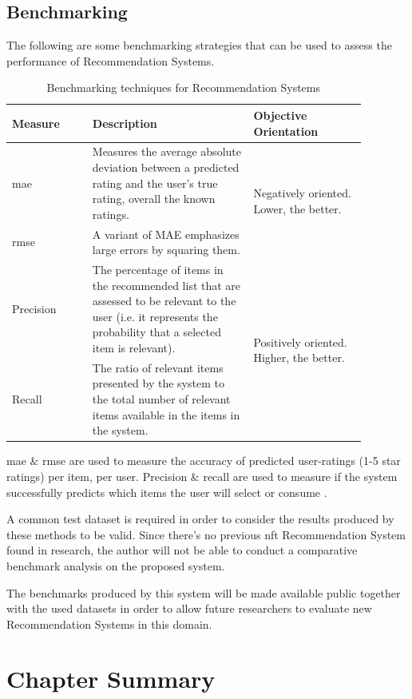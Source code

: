 \subsection{Benchmarking}
The following are some benchmarking strategies that can be used to assess the performance of Recommendation Systems.

\begin{longtable}{|p{0.2\linewidth}|p{0.4\linewidth}|p{0.28\linewidth}|} 
\caption{Benchmarking techniques for Recommendation Systems}
\label{tab:benchmarking-techniques-table}\\
\hline
Measure & Description & Objective Orientation \\ 
\hline
\gls{mae} & Measures the average absolute deviation between a predicted rating and the user’s true rating, overall the known ratings. & \multirow{2}{=}{Negatively oriented. Lower, the better.} \\ 
\cline{1-2}
\gls{rmse} & A variant of MAE emphasizes large errors by squaring them. &  \\ 
\hline
Precision & The percentage of items in the recommended list that are assessed to be relevant to the user (i.e. it represents the probability that a selected item is relevant). & \multirow{2}{=}{Positively oriented. Higher, the better.} \\ 
\cline{1-2}
Recall & The ratio of relevant items presented by the system to the total number of relevant items available in the items in the system. &  \\
\hline
\end{longtable}

\gls{mae} \& \gls{rmse} are used to measure the accuracy of predicted user-ratings (1-5 star ratings) per item, per user. Precision \& recall are used to measure if the system successfully predicts which items the user will select or consume \autocite{dayan_recommenders_2011}.

\bigbreak
A common test dataset is required in order to consider the results produced by these methods to be valid. Since there’s no previous \gls{nft} Recommendation System found in research, the author will not be able to conduct a comparative benchmark analysis on the proposed system.

The benchmarks produced by this system will be made available public together with the used datasets in order to allow future researchers to evaluate new Recommendation Systems in this domain.





\section{Chapter Summary}
